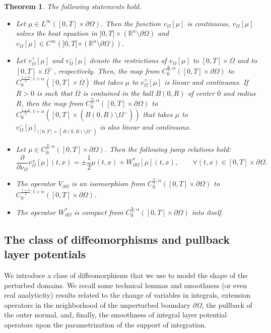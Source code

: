 \documentclass[11pt,reqno,a4paper]{amsart}
\theoremstyle{plain}
\newtheorem{theorem}{Theorem}[section]
\theoremstyle{definition}
\begin{document}
\begin{theorem}\label{thmsl}
The following statements hold.
\begin{itemize}

\item[(i)] Let $\mu \in L^\infty([0,T] \times \partial\Omega)$. Then the function $v_{\Omega}[\mu]$ is continuous, $v_{\Omega}[\mu]$ solves the heat equation 
in $]0,T]\times (\mathbb{R}^n \setminus \partial\Omega)$ and 
$v_{\Omega}[\mu] \in C^\infty(]0,T[ \times (\mathbb{R}^n \setminus \partial\Omega))$. 

\item[(ii)] Let $v_\Omega^+[\mu]$ and $v_\Omega^-[\mu]$ denote 
the restrictions of $v_\Omega[\mu]$ to $[0,T] \times \overline{\Omega}$ and to $[0,T]\times \overline{\Omega^-}$, respectively. Then, the map from  $C_0^{\frac{\alpha}{2};  \alpha}([0,T] \times \partial\Omega)$ to  $C_{0}^{\frac{1+\alpha}{2}; 1+\alpha}([0,T] \times \overline{\Omega})$ that takes $\mu$ to $v_{\Omega}^+[\mu]$ is linear and continuous. If $R>0$ is such that $\overline{\Omega}$ is contained in the ball $B(0,R)$ of center $0$ and radius $R$, then the map from  $C_0^{\frac{\alpha}{2};  \alpha}([0,T] \times \partial\Omega)$ to  $C_{0}^{\frac{1+\alpha}{2}; 1+\alpha}([0,T] \times (\overline{B(0,R)}\setminus \Omega^-))$ that takes $\mu$ to $v_{\Omega}^-[\mu]_{|[0,T] \times (\overline{B(0,R)}\setminus \Omega^-)}$ is also linear and continuous.

\item[(iii)] Let $\mu \in C_0^{\frac{\alpha}{2};  \alpha}([0,T] \times \partial\Omega)$. Then the following jump relations hold: 
\[
\frac{\partial}{\partial \nu_\Omega}v_{\Omega}^\pm[\mu](t,x)  = \pm \frac{1}{2}\mu(t,x)
 +W_{\partial\Omega}^*[\mu](t,x), \qquad \forall (t,x) \in [0,T] \times \partial\Omega.
\]

\item[(iv)] The operator $V_{\partial \Omega}$ is an isomorphism from $C_0^{\frac{\alpha}{2}; \alpha}([0,T] \times \partial\Omega)$ to $C_0^{\frac{1+\alpha}{2}; 1+\alpha}([0,T] \times \partial\Omega)$.

\item[(v)] The operator $W^\ast_{\partial \Omega}$ is compact from $C_0^{\frac{\alpha}{2}; \alpha}([0,T] \times \partial\Omega)$ into itself.
\end{itemize}
\end{theorem}

\subsection{The class of diffeomorphisms and pullback layer potentials} \label{subsec: class of diffeo}
We introduce a class of diffeomorphisms that we use to model the shape of the perturbed domains. We recall some technical lemmas and smoothness (or even real analyticity) results related to the change of variables in integrals, extension operators in the neighborhood of the unperturbed boundary $\partial\Omega$, the pullback of the outer normal, and, finally, the smoothness of integral layer potential operators upon the parametrization of the support of integration.
\end{document}

